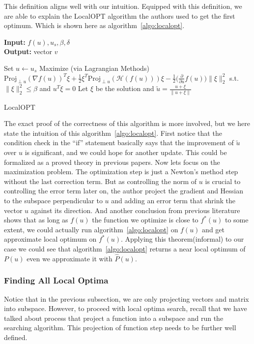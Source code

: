 This definition aligns well with our intuition. Equipped with this
definition, we are able to explain the LocalOPT algorithm the authors
used to get the first optimum. Which is shown here as
algorithm~\ref{algo:localopt}.

\begin{algorithm}[t]
\hspace*{\algorithmicindent} \textbf{Input:} $f(u), u_s, \beta, \delta$\\
\hspace*{\algorithmicindent} \textbf{Output:} vector $v$
\begin{algorithmic}
\STATE Set $u \leftarrow u_s$
\STATE Maximize (via Lagrangian Methods)
	\STATE $\text{Proj}_{\perp u}(\nabla f(u))^T\xi +
	\frac{1}{2}\xi^T \text{Proj}_{\perp u}(\mathcal{H}(f(u)))\xi -
	\frac{1}{2}\big(\frac{\partial}{\partial u}f(u)\big)\|\xi\|_2^2$ s.t.
	\STATE $\|\xi\|_2^2 \leq \beta$ and $u^T\xi = 0$
\STATE Let $\xi$ be the solution and $\tilde{u} = \frac{u + \xi}{\|u +\xi\|}$\; 
\ELSE 
\ENDIF
\end{algorithmic}
\caption{LocalOPT}
\label{algo:localopt}
\end{algorithm}

The exact proof of the correctness of this algorithm is more
involved, but we here state the intuition of this
algorithm~\ref{algo:localopt}. First notice that the condition check
in the ``if'' statement basically says that the improvement of
$\tilde{u}$ over $u$ is significant, and we could hope for another
update. This could be formalized as a proved theory in previous
papers. Now lets focus on the maximization problem. The optimization
step is just a Newton's method step without the last correction term.
But as controlling the norm of $u$ is crucial to controlling the
error term later on, the author project the gradient and Hessian to
the subspace perpendicular to $u$ and adding an error term that
shrink the vector $u$ against its direction. And another conclusion
from previous literature shows that as long as $f(u)$ the function we
optimize is close to $f^*(u)$ to some extent, we could actually run
algorithm~\ref{algo:localopt} on $f(u)$ and get approximate local
optimum on $f^*(u)$. Applying this theorem(informal) to our case we
could see that algorithm~\ref{algo:localopt} returns a near local
optimum of $P(u)$ even we approximate it with $\hat{P}(u)$.

\subsubsection{Finding All Local Optima}
Notice that in the previous subsection, we are only projecting
vectors and matrix into subspace. However, to proceed with local
optima search, recall that we have talked about process that project
a function into a subspace and run the searching algorithm. This
projection of function step needs to be further well defined.

